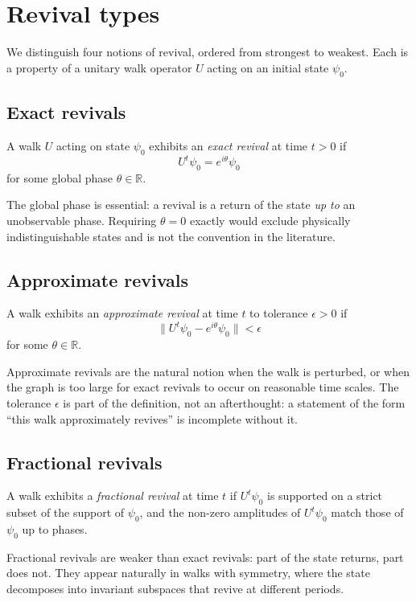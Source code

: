 \section{Revival types}
We distinguish four notions of revival, ordered from strongest to weakest.
Each is a property of a unitary walk operator $U$ acting on an initial
state $\psi_0$.

\subsection{Exact revivals}
\begin{definition}\label{def:exact-revival}
A walk $U$ acting on state $\psi_0$ exhibits an \emph{exact revival} at
time $t > 0$ if
\[
  U^t \psi_0 = e^{i\theta} \psi_0
\]
for some global phase $\theta \in \mathbb{R}$.
\end{definition}
The global phase is essential: a revival is a return of the state
\emph{up to} an unobservable phase. Requiring $\theta = 0$ exactly would
exclude physically indistinguishable states and is not the convention in
the literature.

\subsection{Approximate revivals}
\begin{definition}\label{def:approx-revival}
A walk exhibits an \emph{approximate revival} at time $t$ to tolerance
$\epsilon > 0$ if
\[
  \lVert U^t \psi_0 - e^{i\theta} \psi_0 \rVert < \epsilon
\]
for some $\theta \in \mathbb{R}$.
\end{definition}
Approximate revivals are the natural notion when the walk is perturbed,
or when the graph is too large for exact revivals to occur on reasonable
time scales. The tolerance $\epsilon$ is part of the definition, not an
afterthought: a statement of the form ``this walk approximately revives''
is incomplete without it.

\subsection{Fractional revivals}
\begin{definition}\label{def:fractional-revival}
A walk exhibits a \emph{fractional revival} at time $t$ if $U^t \psi_0$
is supported on a strict subset of the support of $\psi_0$, and the
non-zero amplitudes of $U^t \psi_0$ match those of $\psi_0$ up to phases.
\end{definition}
Fractional revivals are weaker than exact revivals: part of the state
returns, part does not. They appear naturally in walks with symmetry, where
the state decomposes into invariant subspaces that revive at different
periods.

